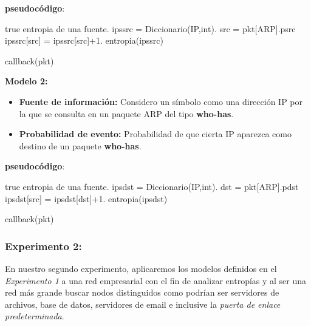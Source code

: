 \newpage
\textbf{pseudocódigo}:
\begin{algorithm}
\begin{algorithmic}
\REQUIRE true
\ENSURE entropia de una fuente.
\STATE ipssrc = Diccionario(IP,int).
\STATE src = pkt[ARP].psrc
\STATE ipssrc[src] = ipssrc[src]+1.
\ENDIF
\RETURN entropia(ipssrc)
\end{algorithmic}
\caption{callback(pkt)}
\end{algorithm}


\textbf{Modelo 2:}
\begin{itemize}
\item \textbf{Fuente de información:} Considero un símbolo como una dirección IP por la que se consulta en un paquete ARP del tipo \textbf{who-has}.
\item \textbf{Probabilidad de evento:} Probabilidad de que cierta IP aparezca como destino de un paquete \textbf{who-has}.
\end{itemize}

\textbf{pseudocódigo}:
\begin{algorithm}
\begin{algorithmic}
\REQUIRE true
\ENSURE entropia de una fuente.
\STATE ipsdst = Diccionario(IP,int).
\STATE dst = pkt[ARP].pdst
\STATE ipsdst[src] = ipsdst[dst]+1.
\ENDIF
\RETURN entropia(ipsdst)
\end{algorithmic}
\caption{callback(pkt)}
\end{algorithm}

\subsubsection{Experimento 2:}
En nuestro segundo experimento, aplicaremos los modelos definidos en el \textit{Experimento 1} a una red empresarial
con el fin de analizar entropías y al ser una red más grande buscar  nodos distinguidos como podrían ser servidores de archivos, 
base de datos, servidores de email e inclusive la \textit{puerta de enlace predeterminada}.

